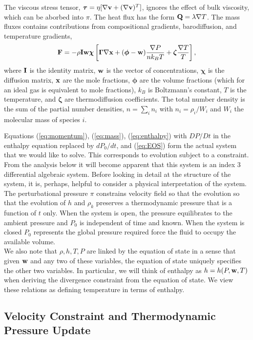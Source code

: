 \documentclass[final]{siamltex}
\def\Fb {{\bf F}}
\def\Ib {{\bf I}}
\def\Qb {{\bf Q}}
\def\vb {{\bf v}}
\def\wb {{\bf w}}
\def\xb {{\bf x}}
\def\chib   {\boldsymbol{\chi}}
\def\Gammab {\boldsymbol{\Gamma}}
\def\phib   {\boldsymbol{\phi}}
\def\taub   {\boldsymbol{\tau}}
\def\zetab  {\boldsymbol{\zeta}}
\begin{document}
The viscous stress tensor,
$\taub = \eta[\nabla\vb + (\nabla\vb)^T]$,
ignores the effect of bulk viscosity, which can be aborbed into $\pi$.
The heat flux has the form $\Qb = \lambda\nabla T$.
The mass fluxes contains contributions from 
compositional gradients, barodiffusion, and temperature gradients,
\begin{equation}
\Fb = -\rho\Ib\wb\chib\left[\Gammab\nabla\xb + (\phib - \wb)\frac{\nabla P}{n k_B T} + \zetab\frac{\nabla T}{T}\right],
\end{equation}
where $\Ib$ is the identity matrix, $\wb$ is the vector of concentrations,
$\chib$ is the diffusion matrix, $\xb$ are the mole fractions,
$\phib$ are the volume fractions (which for an ideal gas is equivalent to mole fractions),
$k_B$ is Boltzmann's constant,
$T$ is the temperature, and $\zetab$ are thermodiffusion coefficients.  The total
number density is the sum of the partial number densities, $n=\sum_i n_i$ with
$n_i=\rho_i/W_i$ and $W_i$ the molecular mass of species $i$.

Equations (\ref{eq:momentum}), (\ref{eq:mass}), (\ref{eq:enthalpy})
with $DP/Dt$ in the enthalpy equation replaced by $dP_0/dt$, and (\ref{eq:EOS})
form the actual system that we would like to solve.
This corresponds to evolution subject to a constraint.  From the analysis below it 
will become apparent that this system is an index 3 differential algebraic system.
Before looking in detail at the structure of the system, it is, perhaps, helpful to 
consider a physical interpretation of the
system.  The perturbational pressure $\pi$ constrains velocity field so that
the evolution so that the evolution of $h$ and $\rho_k$
preserves a thermodynamic pressure that is a function of $t$ only.
When the system is open, the pressure
equilibrates to the ambient pressure and $P_0$ is independent of time and known.
When the system is closed
$P_0$ represents the global pressure
required force the fluid to occupy the available volume.\\

We also note that $\rho, h, T, P$ are linked by the equation of state in a sense that given
$\wb$ and any two of these variables, the equation of state uniquely specifies the other
two variables.  In particular, we will think of enthalpy as $h = h(P,\wb,T)$ when deriving
the divergence constraint from the equation of state.
We view these relations as defining temperature in terms of enthalpy.

\subsection{Velocity Constraint and Thermodynamic Pressure Update}
\end{document}
